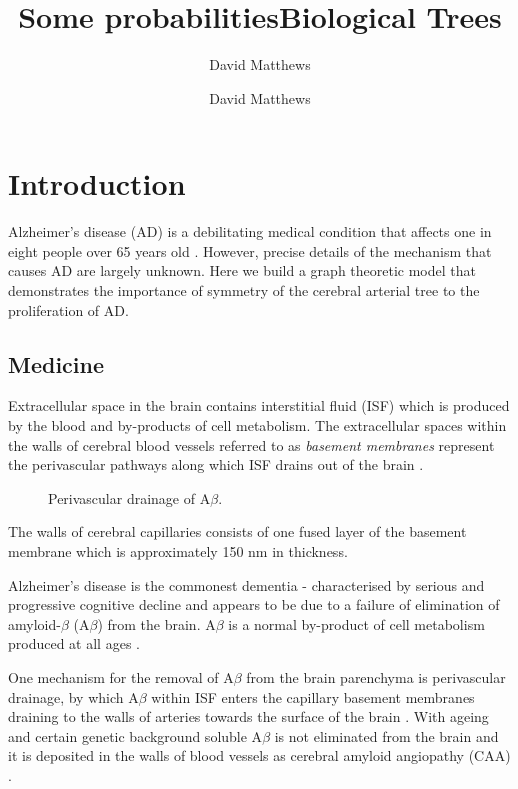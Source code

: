 \documentclass[12pt]{article} %
\title{Some probabilities}
\author{David Matthews}
\theoremstyle{definition}
\begin{document}
\title{Biological Trees}
\author{David Matthews}

\section{Introduction}
Alzheimer's disease (AD) is a debilitating medical condition that affects one in eight people over 65 years old \cite{Bengt}.  However, precise details of the mechanism that causes AD are largely unknown.  Here we build a graph theoretic model that demonstrates the importance of symmetry of the cerebral arterial tree to the proliferation of AD.

\subsection{Medicine}

Extracellular space in the brain contains interstitial fluid (ISF) which is produced by the blood and by-products of cell metabolism.  The extracellular spaces within the walls of cerebral blood vessels referred to as \emph{basement membranes} represent the perivascular pathways along which ISF drains out of the brain \cite{wellerperi,wellermicro,Rox}.  

\begin{figure}[H]

              \centering
                \caption{Perivascular drainage of A$\beta$.}
\end{figure}

The walls of cerebral capillaries consists of one fused layer of  the basement membrane which is approximately 150 nm in thickness.  

Alzheimer's disease is the commonest dementia - characterised by serious and progressive cognitive decline and appears to be due to a failure of elimination of amyloid-$\beta$ (A$\beta$) from the brain.  A$\beta$ is a normal by-product of cell metabolism produced at all ages \cite{}.

One mechanism for the removal of A$\beta$ from the brain parenchyma is perivascular drainage, by which A$\beta$ within ISF enters the capillary basement membranes draining to the walls of arteries towards the surface of the brain \cite{Rox}\cite{wellerperi}.  With ageing and certain genetic background soluble A$\beta$ is not eliminated from the brain and it is deposited in the walls of blood vessels as cerebral amyloid angiopathy (CAA) \cite{Lowe}.  
\end{document}
